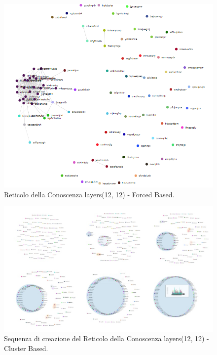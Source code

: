 \begin{figure}[H]
\centering
	\includegraphics[width=0.70\linewidth]{./image/logica(12,12)_forced.png}
	\caption{Reticolo della Conoscenza layers(12, 12) - Forced Based.}
	\label{Reticolo della Conoscenza layers(12, 12) - Forced Based.}
\end{figure}
\noindent

\begin{figure}[H]
\centering
	\includegraphics[width=0.70\linewidth]{./image/collage_reticolo-logica(12,12).png}
	\caption{Sequenza di creazione del Reticolo della Conoscenza layers(12, 12) - Cluster Based.}
	\label{Sequenza di creazione del Reticolo della Conoscenza layers(12, 12) - Cluster Based.}
\end{figure}
\noindent

